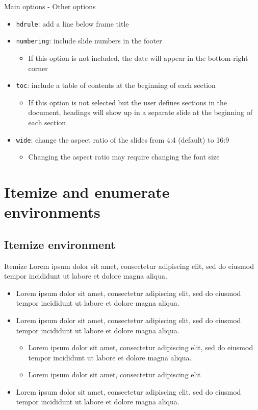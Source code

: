 \documentclass[10pt,numbering,toc]{bpslides}
\begin{document}
\begin{frame}{Main options - Other options}\label{firstslide}
\begin{itemize}
\item \texttt{hdrule}: add a line below frame title
\item \texttt{numbering}: include slide numbers in the footer
\begin{itemize}
\item If this option is not included, the date will appear in the bottom-right corner
\end{itemize}
\item \texttt{toc}: include a table of contents at the beginning of each section
\begin{itemize}
\item If this option is not selected but the user defines sections in the document, headings will show up in a separate slide at the beginning of each section
\end{itemize}
\item \texttt{wide}: change the aspect ratio of the slides from 4:4 (default) to 16:9
\begin{itemize}
\item Changing the aspect ratio may require changing the font size
\end{itemize}
\end{itemize}
\end{frame}

\section{Itemize and enumerate environments}

\subsection{Itemize environment}

\begin{frame}{Itemize}\label{firstslide}
    Lorem ipsum dolor sit amet, consectetur adipiscing elit, sed do eiusmod tempor incididunt ut labore et dolore magna aliqua. 
	\begin{itemize}
	\item Lorem ipsum dolor sit amet, consectetur adipiscing elit, sed do eiusmod tempor incididunt ut labore et dolore magna aliqua.
	\item Lorem ipsum dolor sit amet, consectetur adipiscing elit, sed do eiusmod tempor incididunt ut labore et dolore magna aliqua.
	\begin{itemize}
	\item Lorem ipsum dolor sit amet, consectetur adipiscing elit, sed do eiusmod tempor incididunt ut labore et dolore magna aliqua.
	\item Lorem ipsum dolor sit amet, consectetur adipiscing elit
	\end{itemize}
	\item Lorem ipsum dolor sit amet, consectetur adipiscing elit, sed do eiusmod tempor incididunt ut labore et dolore magna aliqua.
	\end{itemize}
\end{frame}
\end{document}
